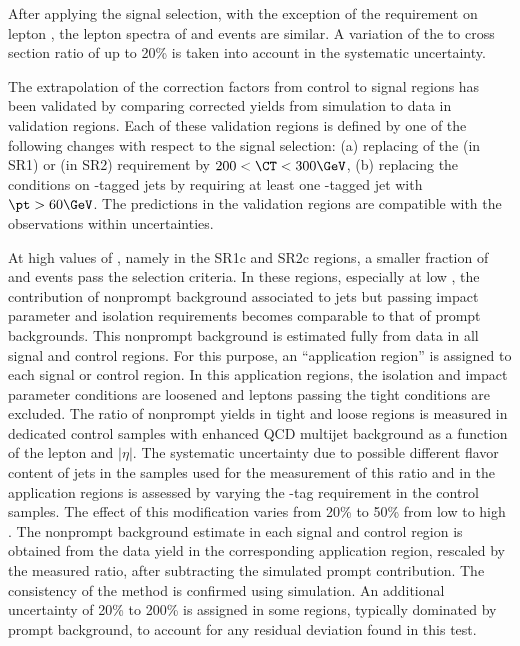 After applying the signal selection, with the exception of the requirement on lepton \pt, 
the lepton \pt spectra of \ttbar and \Wjets events are similar. 
A variation of the \ttbar to \Wjets cross section ratio 
of up to 20\% is taken into account in the systematic uncertainty.

The extrapolation of the correction factors from control to signal regions has been validated by comparing corrected yields from simulation to data in validation regions.
Each of these validation regions is defined by one of the following changes with respect to the signal selection: 
(a) replacing of the \ctone (in SR1) or \cttwo (in SR2) requirement by $200 < \CT <300\GeV$, 
(b) replacing the conditions on \cPqb-tagged jets by requiring at least one \cPqb-tagged jet with $\pt>60\GeV$.
The predictions in the validation regions are compatible with the observations within uncertainties.

At high values of \mt, namely in the SR1c and SR2c regions, a smaller fraction of \Wjets and \ttbar events pass the selection criteria.
In these regions, especially at low \pt, 
the contribution of nonprompt background associated to jets but passing impact parameter and isolation requirements 
becomes comparable to that of prompt backgrounds. This nonprompt background is estimated fully from data in all signal and control regions. 
For this purpose, an ``application region'' is assigned to each signal or control region.
In this application regions, the isolation and impact parameter conditions are loosened and leptons passing the tight conditions are excluded. 
The ratio of nonprompt yields in tight and loose regions is measured in dedicated control samples
with enhanced QCD multijet background as a function of the lepton \pt and $|\eta|$. The systematic uncertainty due to possible different flavor content of jets 
in the samples used for the measurement of this ratio and in the application regions is assessed by varying the \cPqb-tag requirement 
in the control samples.
The effect of this modification varies from 20\% to 50\% from low to high \pt. 
The nonprompt background 
estimate in each signal and control region is obtained from the data yield in the corresponding application region, rescaled by the measured ratio, after subtracting the simulated prompt contribution. 
The consistency of the method is confirmed using simulation.
An additional uncertainty of 20\% to 200\% is assigned in some regions, typically dominated by prompt background, to account for any residual deviation found in this test.

